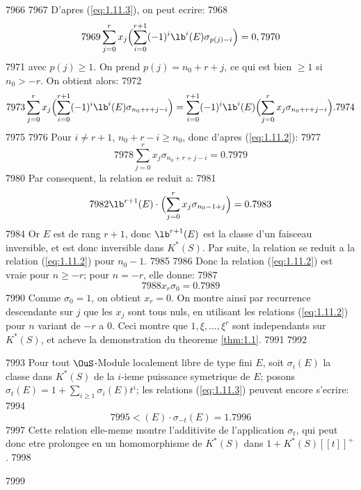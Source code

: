   7966	
  7967	D'apres (\ref{eq:1.11.3}), on peut ecrire:
  7968	\[
  7969	\sum_{j=0}^{r} x_j \Bigl(\sum_{i=0}^{r+1} (-1)^i \lb^i(E) \sigma_{p(j)-i}\Bigr) = 0,
  7970	\]
  7971	avec $p(j) \geqslant 1$. On prend $p(j) = n_0 + r + j$, ce qui est bien $\geqslant 1$ si $n_0 > -r$. On obtient alors:
  7972	\[
  7973	\sum_{j=0}^{r} x_j \Bigl(\sum_{i=0}^{r+1} (-1)^i \lb^i(E) \sigma_{n_0+r+j-i}\Bigr) = \sum_{i=0}^{r+1} (-1)^i \lb^i(E) \Bigl(\sum_{j=0}^{r} x_j \sigma_{n_0+r+j-i}\Bigr).
  7974	\]
  7975	
  7976	Pour $i \neq r+1$, $n_0 + r - i \geqslant n_0$, donc d'apres (\ref{eq:1.11.2}):
  7977	\[
  7978	\sum_{j=0}^{r} x_j \sigma_{n_0+r+j-i} = 0.
  7979	\]
  7980	Par consequent, la relation se reduit a:
  7981	\[
  7982	\lb^{r+1}(E) \cdot \Bigl(\sum_{j=0}^{r} x_j \sigma_{n_0-1+j}\Bigr) = 0.
  7983	\]
  7984	Or $E$ est de rang $r+1$, donc $\lb^{r+1}(E)$ est la classe d'un faisceau inversible, et est donc inversible dans $K^*(S)$. Par suite, la relation se reduit a la relation (\ref{eq:1.11.2}) pour $n_0-1$.
  7985	
  7986	Donc la relation (\ref{eq:1.11.2}) est vraie pour $n \geqslant -r$; pour $n = -r$, elle donne:
  7987	\[
  7988	x_r \sigma_0 = 0.
  7989	\]
  7990	Comme $\sigma_0 = 1$, on obtient $x_r = 0$. On montre ainsi par recurrence descendante sur $j$ que les $x_j$ sont tous nuls, en utilisant les relations (\ref{eq:1.11.2}) pour $n$ variant de $-r$ a $0$. Ceci montre que $1, \xi, \ldots, \xi^r$ sont independants sur $K^*(S)$, et acheve la demonstration du theoreme \ref{thm:1.1}.
  7991	
  7992	\begin{rmq}
  7993	Pour tout $\OuS$-Module localement libre de type fini $E$, soit $\sigma_i(E)$ la classe dans $K^*(S)$ de la $i$-ieme puissance symetrique de $E$; posons $\sigma_t(E) = 1 + \sum_{i \geqslant 1} \sigma_i(E) t^i$; les relations (\ref{eq:1.11.3}) peuvent encore s'ecrire:
  7994	\begin{equation}\label{eq:1.12.1}
  7995	\lt(E) \cdot \sigma_{-t}(E) = 1.
  7996	\end{equation}
  7997	Cette relation elle-meme montre l'additivite de l'application $\sigma_t$, qui peut donc etre prolongee en un homomorphisme de $K^*(S)$ dans $1 + K^*(S)[[t]]^+$.
  7998	\end{rmq}
  7999	
